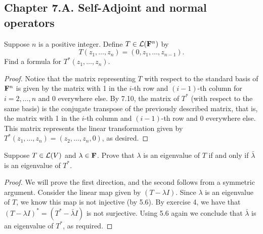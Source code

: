 \subsection*{Chapter 7.A. Self-Adjoint and normal operators}


\begin{exercise}{1}
  Suppose $n$ is a positive integer. Define $T\in\mathcal{L}(\mathbf{F}^n)$ by 
  \[T(z_1,\dots,z_n)=(0,z_1,\dots,z_{n-1}).\]
  Find a formula for $T^\ast(z_1,\dots,z_n)$.
\end{exercise}
\begin{proof}
 Notice that the matrix representing $T$ with respect to the standard basis of $\mathbf{F}^n$ is given by the matrix with 1 in the $i$-th row and $(i-1)$-th column for $i=2,\dots,n$ and 0 everywhere else. By 7.10, the matrix of $T^\ast$ (with respect to the same basis) is the conjugate transpose of the previously described matrix, that is, the matrix with 1 in the $i$-th column and $(i-1)$-th row and 0 everywhere else. This matrix represents the linear transformation given by $T^\ast(z_1,\dots,z_n)=(z_2,\dots,z_{n},0)$, as desired.
\end{proof}

\begin{exercise}{2}
  Suppose $T\in\mathcal{L}(V)$ and $\lambda\in\mathbf{F}$. Prove that $\lambda$ is an eigenvalue of $T$ if and only if $\bar{\lambda}$ is an eigenvalue of $T^\ast$.
\end{exercise}
\begin{proof}
 We will prove the first direction, and the second follows from a symmetric argument. Consider the linear map given by $(T-\lambda I)$. Since $\lambda$ is an eigenvalue of $T$, we know this map is not injective (by 5.6). By exercise 4, we have that $(T-\lambda I)^\ast=(T^\ast-\bar{\lambda}I)$ is not surjective. Using 5.6 again we conclude that $\bar{\lambda}$ is an eigenvalue of $T^\ast$, as required.
\end{proof}

